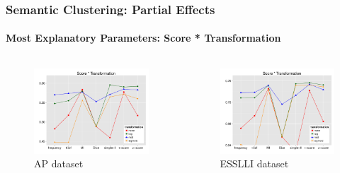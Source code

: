 \documentclass[t]{beamer} %
\begin{document}
\begin{frame}
  \frametitle{Semantic Clustering: Partial Effects}
  \framesubtitle{Most Explanatory Parameters: Score * Transformation}

  \vspace{-18pt}

  \begin{columns}
    
    \begin{column}{0.5\textwidth}
      \begin{figure} 
        \hspace*{-18pt} 
        \includegraphics[scale=0.30]{img/lapesa_ap_main_score_transformation}
        \vspace{-10pt}
        \caption{AP dataset}
      \end{figure}
    \end{column}

    \begin{column}{0.5\textwidth}
      \centering
      
      \begin{figure}
        \hspace*{-18pt}   
        \includegraphics[scale=0.30]{img/lapesa_esslli_main_score_transformation}
        \vspace{-10pt}
        \caption{ESSLLI dataset}
      \end{figure}
      

\end{column}
\end{columns}
\end{frame}
\end{document}
